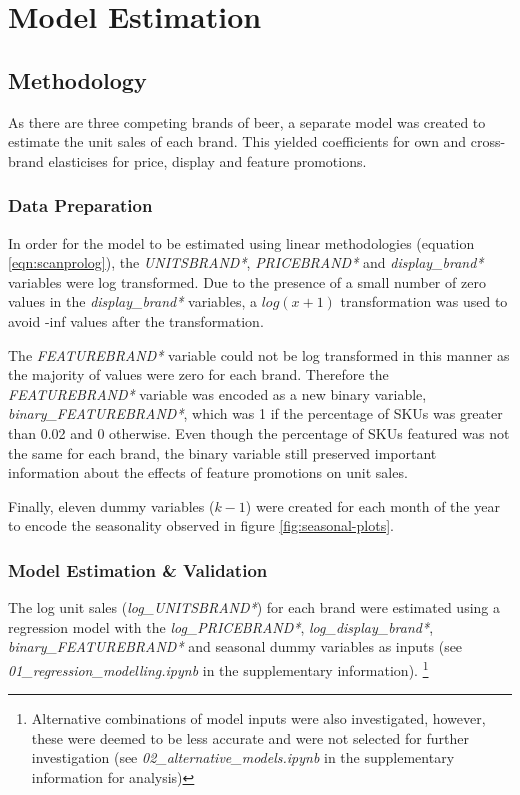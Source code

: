 \documentclass[a4paper,11pt]{article}
\begin{document}
\section{Model Estimation}
\subsection{Methodology}
As there are three competing brands of beer, a separate model was created to estimate the unit sales of each brand. This yielded coefficients for own and cross-brand elasticises for price, display and feature promotions.

\subsubsection{Data Preparation}
In order for the model to be estimated using linear methodologies (equation \ref{eqn:scanprolog}), the \textit{UNITSBRAND*}, \textit{PRICEBRAND*} and \textit{display\_brand*} variables were log transformed. Due to the presence of a small number of zero values in the \textit{display\_brand*} variables, a $log(x+1)$ transformation was used to avoid -inf values after the transformation.

The \textit{FEATUREBRAND*} variable could not be log transformed in this manner as the majority of values were zero for each brand. Therefore the \textit{FEATUREBRAND*} variable was encoded as a new binary variable, \textit{binary\_FEATUREBRAND*}, which was 1 if the percentage of SKUs was greater than 0.02 and 0 otherwise. Even though the percentage of SKUs featured was not the same for each brand, the binary variable still preserved important information about the effects of feature promotions on unit sales.

Finally, eleven dummy variables ($k-1$) were created for each month of the year to encode the seasonality observed in figure \ref{fig:seasonal-plots}.


\subsubsection{Model Estimation \& Validation}

The log unit sales (\textit{log\_UNITSBRAND*}) for each brand were estimated using a regression model with the \textit{log\_PRICEBRAND*}, \textit{log\_display\_brand*}, \textit{binary\_FEATUREBRAND*} and seasonal dummy variables as inputs (see \textit{01\_regression\_modelling.ipynb} in the supplementary information). \footnote{Alternative combinations of model inputs were also investigated, however, these were deemed to be less accurate and were not selected for further investigation (see \textit{02\_alternative\_models.ipynb} in the supplementary information for analysis)}
\end{document}
